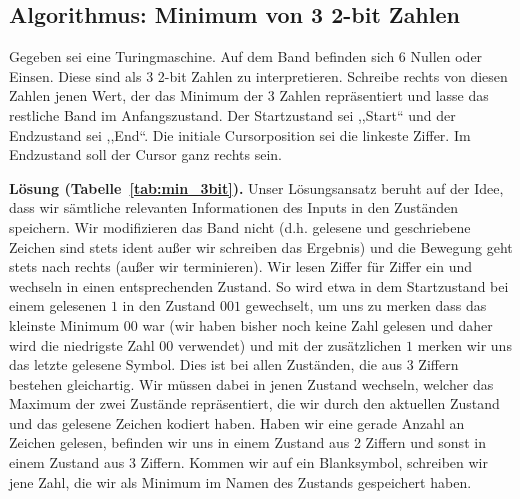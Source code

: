 \subsection{Algorithmus: Minimum von 3 2-bit Zahlen}
%
Gegeben sei eine Turingmaschine. Auf dem Band befinden sich 6 Nullen oder Einsen. Diese sind als 3 2-bit Zahlen zu interpretieren. Schreibe rechts von diesen Zahlen jenen Wert, der das Minimum der 3 Zahlen repräsentiert und lasse das restliche Band im Anfangszustand. Der Startzustand sei ,,Start`` und der Endzustand sei ,,End``. Die initiale Cursorposition sei die linkeste Ziffer. Im Endzustand soll der Cursor ganz rechts sein.

\textbf{Lösung (Tabelle~\ref{tab:min_3bit}).} Unser Lösungsansatz beruht auf der Idee, dass wir sämtliche relevanten Informationen des Inputs in den Zuständen speichern. Wir modifizieren das Band nicht (d.h. gelesene und geschriebene Zeichen sind stets ident außer wir schreiben das Ergebnis) und die Bewegung geht stets nach rechts (außer wir terminieren). Wir lesen Ziffer für Ziffer ein und wechseln in einen entsprechenden Zustand. So wird etwa in dem Startzustand bei einem gelesenen $1$ in den Zustand $001$ gewechselt, um uns zu merken dass das kleinste Minimum $00$ war (wir haben bisher noch keine Zahl gelesen und daher wird die niedrigste Zahl $00$ verwendet) und mit der zusätzlichen $1$ merken wir uns das letzte gelesene Symbol. Dies ist bei allen Zuständen, die aus 3 Ziffern bestehen gleichartig. Wir müssen dabei in jenen Zustand wechseln, welcher das Maximum der zwei Zustände repräsentiert, die wir durch den aktuellen Zustand und das gelesene Zeichen kodiert haben. Haben wir eine gerade Anzahl an Zeichen gelesen, befinden wir uns in einem Zustand aus 2 Ziffern und sonst in einem Zustand aus 3 Ziffern. Kommen wir auf ein Blanksymbol, schreiben wir jene Zahl, die wir als Minimum im Namen des Zustands gespeichert haben.
%

